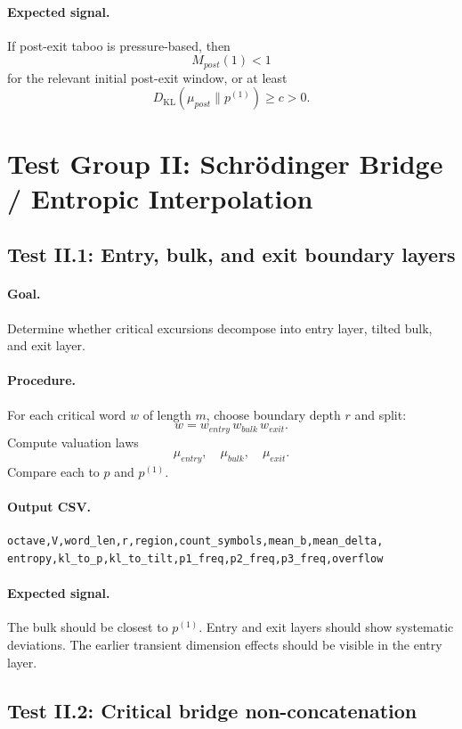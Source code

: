 \documentclass[11pt]{article}
\newcommand{\KL}{D_{\mathrm{KL}}}
\begin{document}
\paragraph{Expected signal.}
If post-exit taboo is pressure-based, then
\[
  M_{post}(1)<1
\]
for the relevant initial post-exit window, or at least
\[
  \KL(\mu_{post}\|p^{(1)})\ge c>0.
\]

\section{Test Group II: Schr\"odinger Bridge / Entropic Interpolation}

\subsection{Test II.1: Entry, bulk, and exit boundary layers}

\paragraph{Goal.} Determine whether critical excursions decompose into entry layer, tilted bulk, and exit layer.

\paragraph{Procedure.}
For each critical word $w$ of length $m$, choose boundary depth $r$ and split:
\[
  w=w_{entry}\,w_{bulk}\,w_{exit}.
\]
Compute valuation laws
\[
  \mu_{entry},\quad \mu_{bulk},\quad \mu_{exit}.
\]
Compare each to $p$ and $p^{(1)}$.

\paragraph{Output CSV.}
\begin{verbatim}
octave,V,word_len,r,region,count_symbols,mean_b,mean_delta,
entropy,kl_to_p,kl_to_tilt,p1_freq,p2_freq,p3_freq,overflow
\end{verbatim}

\paragraph{Expected signal.}
The bulk should be closest to $p^{(1)}$. Entry and exit layers should show systematic deviations. The earlier transient dimension effects should be visible in the entry layer.

\subsection{Test II.2: Critical bridge non-concatenation}
\end{document}
